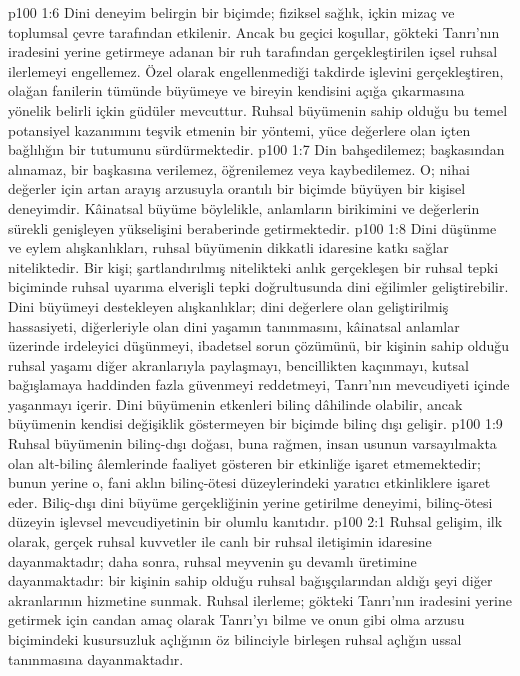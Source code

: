 \vs p100 1:6 Dini deneyim belirgin bir biçimde; fiziksel sağlık, içkin mizaç ve toplumsal çevre tarafından etkilenir. Ancak bu geçici koşullar, gökteki Tanrı’nın iradesini yerine getirmeye adanan bir ruh tarafından gerçekleştirilen içsel ruhsal ilerlemeyi engellemez. Özel olarak engellenmediği takdirde işlevini gerçekleştiren, olağan fanilerin tümünde büyümeye ve bireyin kendisini açığa çıkarmasına yönelik belirli içkin güdüler mevcuttur. Ruhsal büyümenin sahip olduğu bu temel potansiyel kazanımını teşvik etmenin bir yöntemi, yüce değerlere olan içten bağlılığın bir tutumunu sürdürmektedir.
\vs p100 1:7 Din bahşedilemez; başkasından alınamaz, bir başkasına verilemez, öğrenilemez veya kaybedilemez. O; nihai değerler için artan arayış arzusuyla orantılı bir biçimde büyüyen bir kişisel deneyimdir. Kâinatsal büyüme böylelikle, anlamların birikimini ve değerlerin sürekli genişleyen yükselişini beraberinde getirmektedir.
\vs p100 1:8 Dini düşünme ve eylem alışkanlıkları, ruhsal büyümenin dikkatli idaresine katkı sağlar niteliktedir. Bir kişi; şartlandırılmış nitelikteki anlık gerçekleşen bir ruhsal tepki biçiminde ruhsal uyarıma elverişli tepki doğrultusunda dini eğilimler geliştirebilir. Dini büyümeyi destekleyen alışkanlıklar; dini değerlere olan geliştirilmiş hassasiyeti, diğerleriyle olan dini yaşamın tanınmasını, kâinatsal anlamlar üzerinde irdeleyici düşünmeyi, ibadetsel sorun çözümünü, bir kişinin sahip olduğu ruhsal yaşamı diğer akranlarıyla paylaşmayı, bencillikten kaçınmayı, kutsal bağışlamaya haddinden fazla güvenmeyi reddetmeyi, Tanrı’nın mevcudiyeti içinde yaşanmayı içerir. Dini büyümenin etkenleri bilinç dâhilinde olabilir, ancak büyümenin kendisi değişiklik göstermeyen bir biçimde bilinç dışı gelişir.
\vs p100 1:9 Ruhsal büyümenin bilinç\hyp{}dışı doğası, buna rağmen, insan usunun varsayılmakta olan alt\hyp{}bilinç âlemlerinde faaliyet gösteren bir etkinliğe işaret etmemektedir; bunun yerine o, fani aklın bilinç\hyp{}ötesi düzeylerindeki yaratıcı etkinliklere işaret eder. Biliç\hyp{}dışı dini büyüme gerçekliğinin yerine getirilme deneyimi, bilinç\hyp{}ötesi düzeyin işlevsel mevcudiyetinin bir olumlu kanıtıdır.
\vs p100 2:1 Ruhsal gelişim, ilk olarak, gerçek ruhsal kuvvetler ile canlı bir ruhsal iletişimin idaresine dayanmaktadır; daha sonra, ruhsal meyvenin şu devamlı üretimine dayanmaktadır: bir kişinin sahip olduğu ruhsal bağışçılarından aldığı şeyi diğer akranlarının hizmetine sunmak. Ruhsal ilerleme; gökteki Tanrı’nın iradesini yerine getirmek için candan amaç olarak Tanrı’yı bilme ve onun gibi olma arzusu biçimindeki kusursuzluk açlığının öz bilinciyle birleşen ruhsal açlığın ussal tanınmasına dayanmaktadır.
